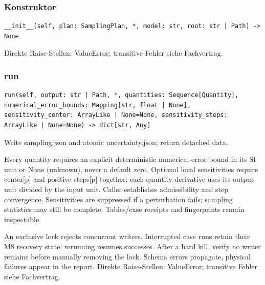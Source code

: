 \subsubsection*{Konstruktor}
\begin{lstlisting}
__init__(self, plan: SamplingPlan, *, model: str, root: str | Path) -> None
\end{lstlisting}
Direkte Raise-Stellen: ValueError; transitive Fehler siehe Fachvertrag.
\subsubsection*{run}
\begin{lstlisting}
run(self, output: str | Path, *, quantities: Sequence[Quantity], numerical_error_bounds: Mapping[str, float | None], sensitivity_center: ArrayLike | None=None, sensitivity_steps: ArrayLike | None=None) -> dict[str, Any]
\end{lstlisting}
Write sampling.json and atomic uncertainty.json; return detached data.\par Every quantity requires an explicit deterministic numerical-error bound in its SI unit or None (unknown), never a default zero. Optional local sensitivities require center[p] and positive steps[p] together; each quantity derivative uses its output unit divided by the input unit. Caller establishes admissibility and step convergence. Sensitivities are suppressed if a perturbation fails; sampling statistics may still be complete. Tables/case receipts and fingerprints remain inspectable.\par An exclusive lock rejects concurrent writers. Interrupted case runs retain their M8 recovery state; rerunning resumes successes. After a hard kill, verify no writer remains before manually removing the lock. Schema errors propagate, physical failures appear in the report.
Direkte Raise-Stellen: ValueError; transitive Fehler siehe Fachvertrag.
\endgroup
